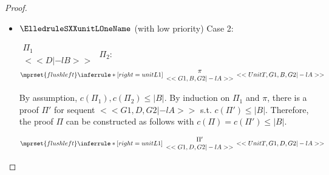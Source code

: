 \begin{proof}
\begin{enumerate}
\begin{itemize}
  \item $\ElledruleSXXunitLOneName$ (with low priority) Case 2:
    \begin{center}
      \scriptsize
      \begin{math}
        \begin{array}{c}
          \Pi_1 \\
          {<<D |-l B>>}
        \end{array}
      \end{math}
      \qquad\qquad
      $\Pi_2$:
      \begin{math}
        $$\mprset{flushleft}
        \inferrule* [right={\tiny unitL1}] {
          {
            \begin{array}{c}
              \pi \\
              {<<G1, B, G2 |-l A>>}
            \end{array}
          }
        }{<<UnitT, G1, B, G2 |-l A>>}
      \end{math}
    \end{center}
    By assumption, $c(\Pi_1),c(\Pi_2)\leq |B|$. By induction on $\Pi_1$ and $\pi$, there is a
    proof $\Pi'$ for sequent $<<G1, D, G2 |-l A>>$ s.t. $c(\Pi') \leq |B|$. Therefore, the
    proof $\Pi$ can be constructed as follows with $c(\Pi) = c(\Pi') \leq |B|$.
    \begin{center}
      \scriptsize
      \begin{math}
        $$\mprset{flushleft}
        \inferrule* [right={\tiny unitL1}] {
          {
            \begin{array}{c}
              \Pi' \\
              {<<G1, D, G2 |-l A>>}
            \end{array}
          }
        }{<<UnitT, G1, D, G2 |-l A>>}
      \end{math}
    \end{center}


\end{itemize}
\end{enumerate}
\end{proof}
